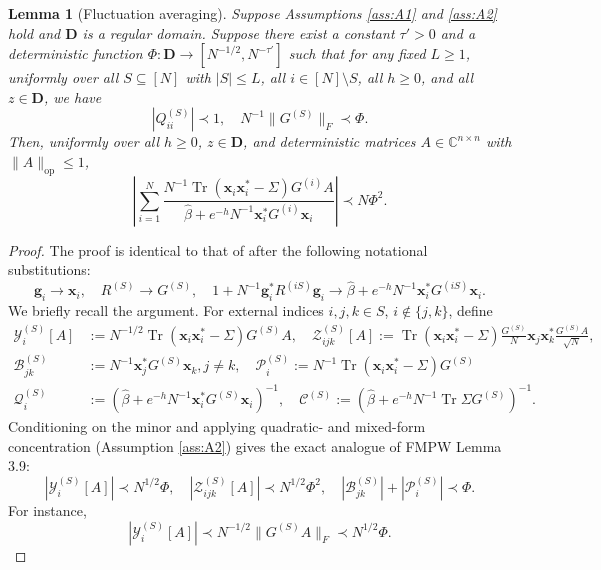 \documentclass[11pt,reqno]{amsart}
\def\g{\mathbf{g}}
\def\x{\mathbf{x}}
\def\C{\mathbb{C}}
\def\cY{\mathcal{Y}}
\def\cZ{\mathcal{Z}}
\def\cB{\mathcal{B}}
\def\cQ{\mathcal{Q}}
\def\cP{\mathcal{P}}
\def\cC{\mathcal{C}}
\def\bD{\mathbf{D}}
\def\op{\mathrm{op}}
\def\Tr{\operatorname{Tr}}
\newtheorem{lemma}[theorem]{Lemma}
\theoremstyle{definition}
\numberwithin{equation}{section}
\numberwithin{figure}{section}
\begin{document}
\begin{lemma}[Fluctuation averaging]\label{lem:fluctuation averaging}
Suppose Assumptions \ref{ass:A1} and \ref{ass:A2} hold and $\bD$ is a regular domain. Suppose there exist a constant $\tau'>0$ and a deterministic function $\Phi:\bD\rightarrow[N^{-1/2},N^{-\tau'}]$ such that for any fixed $L\geq 1$, uniformly over all $S\subseteq[N]$ with $|S|\leq L$, all $i\in[N]\setminus S$, all $h\geq 0$, and all $z\in\bD$, we have
\[
    |Q_{ii}^{(S)}|\prec 1,\quad N^{-1}\|G^{(S)}\|_F\prec \Phi.
\]
Then, uniformly over all $h\geq 0$, $z\in\bD$, and deterministic matrices $A\in\C^{n\times n}$ with $\|A\|_\op\leq 1$,
\[
    \left|\sum_{i=1}^N\frac{N^{-1}\Tr(\x_i\x_i^*-\Sigma)G^{(i)}A}{\hat\beta +e^{-h}N^{-1}\x_i^*G^{(i)}\x_i}\right|\prec N\Phi^2.
\]
\end{lemma}
\begin{proof}
The proof is identical to that of \cite[Lemma 3.4]{fan2026anisotropic} after the following notational substitutions:
\[
    \g_i\rightarrow\x_i,\quad R^{(S)}\rightarrow G^{(S)},\quad 1+N^{-1}\g_i^*R^{(iS)}\g_i\rightarrow\hat\beta+e^{-h}N^{-1}\x_i^*G^{(iS)}\x_i.
\]
We briefly recall the argument. For external
indices $i,j,k\in S$, $i\notin\{j,k\}$, define
\begin{align*}
 \cY_i^{(S)}[A]
 &:=
 N^{-1/2}\Tr(\x_i\x_i^*-\Sigma)G^{(S)}A,\quad \cZ_{ijk}^{(S)}[A]
 :=
 \Tr(\x_i\x_i^*-\Sigma)
 \frac{G^{(S)}}N \x_j\x_k^*
 \frac{G^{(S)}A}{\sqrt N},\\
 \cB_{jk}^{(S)}
 &:=
 N^{-1}\x_j^*G^{(S)}\x_k,j\ne k,\quad \cP_i^{(S)}:=
 N^{-1}\Tr(\x_i\x_i^*-\Sigma)G^{(S)}\\
 \cQ_i^{(S)}&:=(\hat\beta+e^{-h}N^{-1}\x_i^*G^{(S)}\x_i)^{-1},\quad \cC^{(S)}:=(\hat\beta+e^{-h}N^{-1}\Tr\Sigma G^{(S)})^{-1}.
\end{align*}
Conditioning on the minor and applying quadratic- and mixed-form
concentration (Assumption \ref{ass:A2}) gives the exact analogue of FMPW Lemma 3.9:
\begin{equation}\label{eq:fmpw-aux-bounds}
 |\cY_i^{(S)}[A]|\prec N^{1/2}\Phi,\quad
 |\cZ_{ijk}^{(S)}[A]|\prec N^{1/2}\Phi^2,\quad
 |\cB_{jk}^{(S)}|+|\cP_i^{(S)}|\prec\Phi .
\end{equation}
For instance,
\[
 |\cY_i^{(S)}[A]|
 \prec N^{-1/2}\|G^{(S)}A\|_{F}
 \prec N^{1/2}\Phi.
\]


\end{proof}
\end{document}
